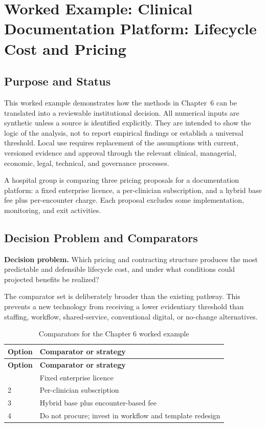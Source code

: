 \section{Worked Example: Clinical Documentation Platform: Lifecycle Cost and Pricing}
\label{sec:comp-ch06-worked-example}

\subsection{Purpose and Status}
This worked example demonstrates how the methods in Chapter~6 can be
translated into a reviewable institutional decision. All numerical inputs are
synthetic unless a source is identified explicitly. They are intended to show the
logic of the analysis, not to report empirical findings or establish a universal
threshold. Local use requires replacement of the assumptions with current,
versioned evidence and approval through the relevant clinical, managerial,
economic, legal, technical, and governance processes.

A hospital group is comparing three pricing proposals for a documentation platform: a fixed enterprise licence, a per-clinician subscription, and a hybrid base fee plus per-encounter charge. Each proposal excludes some implementation, monitoring, and exit activities. 

\subsection{Decision Problem and Comparators}
\textbf{Decision problem.} Which pricing and contracting structure produces the most predictable and defensible lifecycle cost, and under what conditions could projected benefits be realized?

The comparator set is deliberately broader than the existing pathway. This prevents
a new technology from receiving a lower evidentiary threshold than staffing,
workflow, shared-service, conventional digital, or no-change alternatives.

\begin{longtable}{@{}p{}p{}@{}}
\caption{Comparators for the Chapter 6 worked example}
\label{tab:comp-ch06-comparators}\\
\toprule
\textbf{Option} & \textbf{Comparator or strategy} \\
\midrule
\endfirsthead
\toprule
\textbf{Option} & \textbf{Comparator or strategy} \\
\midrule
\endhead
\bottomrule
\endlastfoot
1 & Fixed enterprise licence \\
2 & Per-clinician subscription \\
3 & Hybrid base plus encounter-based fee \\
4 & Do not procure; invest in workflow and template redesign \\
\end{longtable}


